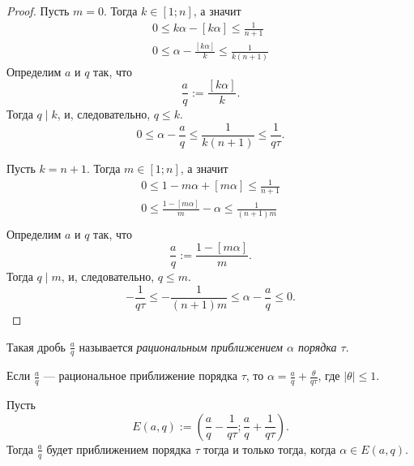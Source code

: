 \documentclass[12pt,a4paper]{article}
\begin{document}
\begin{proof}
        Пусть $m = 0$. Тогда $k \in [1; n]$, а значит
        \begin{gather*}
            0 \leqslant k \alpha - [k \alpha] \leqslant \frac{1}{n+1}\\
            0 \leqslant \alpha - \frac{[k \alpha]}{k} \leqslant \frac{1}{k(n+1)}
        \end{gather*}
        Определим $a$ и $q$ так, что
        \[\frac{a}{q} := \frac{[k \alpha]}{k}.\]
        Тогда $q \mid k$, и, следовательно, $q \leqslant k$.
        \[0 \leqslant \alpha - \frac{a}{q} \leqslant \frac{1}{k(n+1)} \leqslant \frac{1}{q \tau}.\]

        Пусть $k = n+1$. Тогда $m \in [1; n]$, а значит
        \begin{gather*}
            0 \leqslant 1 - m \alpha + [m \alpha] \leqslant \frac{1}{n+1}\\
            0 \leqslant \frac{1 - [m \alpha]}{m} - \alpha \leqslant \frac{1}{(n+1)m}\\
        \end{gather*}
        Определим $a$ и $q$ так, что
        \[\frac{a}{q} := \frac{1 - [m \alpha]}{m}.\]
        Тогда $q \mid m$, и, следовательно, $q \leqslant m$.
        \[-\frac{1}{q \tau} \leqslant -\frac{1}{(n+1) m} \leqslant \alpha - \frac{a}{q} \leqslant 0.\]
    \end{proof}

    \begin{remark}
        Такая дробь $\frac{a}{q}$ называется \emph{рациональным приближением $\alpha$ порядка $\tau$}.
    \end{remark}

    \begin{remark}
        Если $\frac{a}{q}$ --- рациональное приближение порядка $\tau$, то $\alpha = \frac{a}{q} + \frac{\theta}{q \tau}$, где $|\theta| \leqslant 1$.
    \end{remark}

    \begin{remark}
        Пусть
        \[E(a, q) := \left(\frac{a}{q} - \frac{1}{q \tau}; \frac{a}{q} + \frac{1}{q \tau}\right).\]
        Тогда $\frac{a}{q}$ будет приближением порядка $\tau$ тогда и только тогда, когда $\alpha \in E(a, q)$.
    \end{remark}
\end{document}
